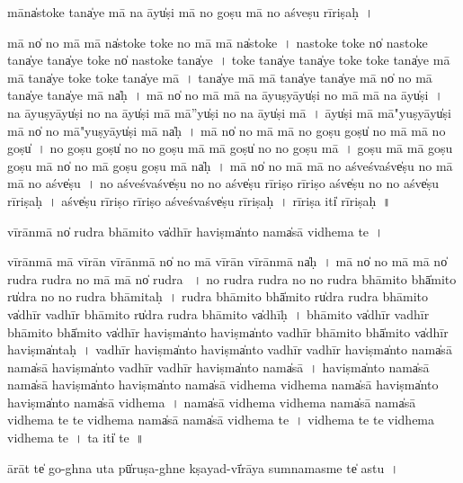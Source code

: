 \documentclass[parskip, DIV=14]{scrartcl}
\begin{document}
{māna̍sto॒ke tana̍ye॒ mā na॒ āyu̍ṣi॒ mā no॒ goṣu॒ mā no॒ aśveṣu rīriṣaḥ~।

mā no̍ no॒ mā mā na̍sto॒ke to॒ke no॒ mā mā na̍sto॒ke~।
na॒sto॒ke to॒ke no̍ nasto॒ke tana̍ye॒ tana̍ye  to॒ke no̍ nasto॒ke tana̍ye~।
to॒ke tana̍ye॒ tana̍ye to॒ke to॒ke tana̍ye॒ mā mā tana̍ye to॒ke to॒ke tana̍ye॒ mā~।
tana̍ye॒ mā mā tana̍ye॒ tana̍ye॒ mā no̍ no॒ mā tana̍ye॒ tana̍ye॒ mā na̍ḥ~।
mā no̍ no॒ mā mā na॒ āyu॒ṣyāyu̍ṣi no॒ mā mā na॒ āyu̍ṣi~।
na॒ āyu॒ṣyāyu̍ṣi no na॒ āyu̍ṣi॒ mā mā''yu̍ṣi no na॒ āyu̍ṣi॒ mā~।
āyu̍ṣi॒ mā mā"yu॒ṣyāyu̍ṣi॒ mā no̍ no॒ mā"yu॒ṣyāyu̍ṣi॒ mā na̍ḥ~।
mā no̍ no॒ mā mā no॒ goṣu॒ goṣu̍ no॒ mā mā no॒ goṣu̍~।
no॒ goṣu॒ goṣu̍ no no॒ goṣu॒ mā mā goṣu̍ no no॒ goṣu॒ mā~।
goṣu॒ mā mā goṣu॒ goṣu॒ mā no̍ no॒ mā goṣu॒ goṣu॒ mā na̍ḥ~।
mā no̍ no॒ mā mā no॒ aśve॒śvaśve̍ṣu no॒ mā mā no॒ aśve̍ṣu~।
no॒ aśve॒śvaśve̍ṣu no no॒ aśve̍ṣu rīriṣo rīriṣo॒ aśve̍ṣu no no॒ aśve̍ṣu rīriṣaḥ~। %
aśve̍ṣu rīriṣo rīriṣo॒ aśve॒śvaśve̍ṣu rīriṣaḥ~।
rī॒ri॒ṣa॒ iti̍ rīriṣaḥ~॥ 

vī॒rānmā no̍ rudra bhāmi॒to va̍dhīr ha॒viṣma̍nto॒ nama̍sā vidhema te~।

vī॒rānmā mā vī॒rān vī॒rānmā no̍ no॒ mā vī॒rān vī॒rānmā na̍ḥ~।
mā no̍ no॒ mā mā no̍ rudra rudra no॒ mā mā no̍ rudra ~।
no॒ ru॒dra॒ ru॒dra॒ no॒ no॒ ru॒dra॒ bhā॒mi॒to bhā̍mi॒to ru̍dra no no rudra bhāmi॒taḥ~। %
ru॒dra॒ bhā॒mi॒to bhā̍mi॒to ru̍dra rudra bhāmi॒to va̍dhīr vadhīr bhāmi॒to ru̍dra rudra bhāmi॒to va̍dhīḥ~।
bhā॒mi॒to va̍dhīr vadhīr bhāmi॒to bhā̍mi॒to va̍dhīr ha॒viṣma̍nto ha॒viṣma̍nto vadhīr bhāmi॒to bhā̍mi॒to va̍dhīr ha॒viṣma̍ntaḥ~।
va॒dhī॒r ha॒viṣma̍nto ha॒viṣma̍nto vadhīr vadhīr ha॒viṣma̍nto॒ nama̍sā॒ nama̍sā ha॒viṣma̍nto vadhīr vadhīr ha॒viṣma̍nto॒ nama̍sā~।
ha॒viṣma̍nto॒ nama̍sā॒ nama̍sā ha॒viṣma̍nto ha॒viṣma̍nto॒ nama̍sā vidhema vidhema॒ nama̍sā ha॒viṣma̍nto ha॒viṣma̍nto॒ nama̍sā vidhema~।
nama̍sā vidhema vidhema॒ nama̍sā॒ nama̍sā vidhema te te vidhema॒ nama̍sā॒ nama̍sā vidhema te~।
vi॒dhe॒ma॒ te॒ te॒ vi॒dhe॒ma॒ vi॒dhe॒ma॒ te॒~।
ta॒ iti̍ te~॥ 

ā॒rāt te̍ go॒-ghna u॒ta pū̍ruṣa॒-ghne kṣa॒yad-vī̍rāya su॒mnama॒sme te̍ astu~।

}
\end{document}
